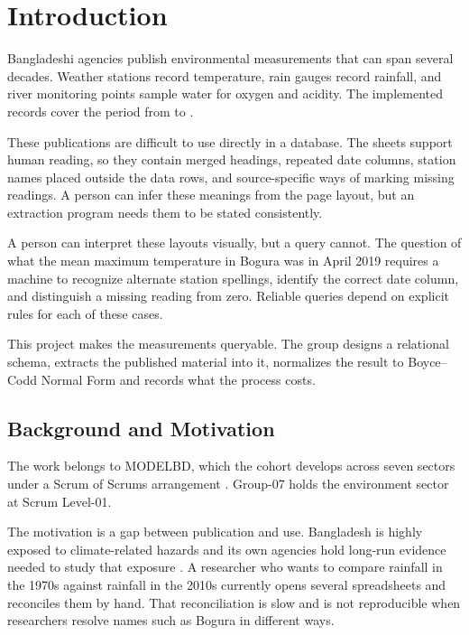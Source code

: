 \section{Introduction}
\label{sec:introduction}

Bangladeshi agencies publish environmental measurements that can span several
decades. Weather stations record temperature, rain gauges record rainfall, and
river monitoring points sample water for oxygen and acidity. The implemented
records cover the period from \mYearMin{} to \mYearMax.

These publications are difficult to use directly in a database. The sheets
support human reading, so they contain merged headings, repeated date columns,
station names placed outside the data rows, and source-specific ways of marking
missing readings. A person can infer these meanings from the page layout, but
an extraction program needs them to be stated consistently.

A person can interpret these layouts visually, but a query cannot. The
question of what the mean maximum temperature in Bogura was in April 2019
requires a machine to recognize alternate station spellings, identify the
correct date column, and distinguish a missing reading from zero. Reliable
queries depend on explicit rules for each of these cases.

This project makes the measurements queryable. The group designs a relational
schema, extracts the published material into it, normalizes the result to
Boyce--Codd Normal Form and records what the process costs.

\subsection{Background and Motivation}
\label{subsec:bm}

The work belongs to MODELBD, which the cohort develops across seven sectors
under a Scrum of Scrums arrangement \cite{scrumguide2020}. Group-07 holds the
environment sector at Scrum Level-01.

The motivation is a gap between publication and use. Bangladesh is highly
exposed to climate-related hazards and its own agencies hold long-run evidence
needed to study that exposure \cite{worldbank_climate_bd}. A researcher who
wants to compare rainfall in the 1970s against rainfall in the 2010s currently
opens several spreadsheets and reconciles them by hand. That reconciliation is
slow and is not reproducible when researchers resolve names such as Bogura in
different ways.

